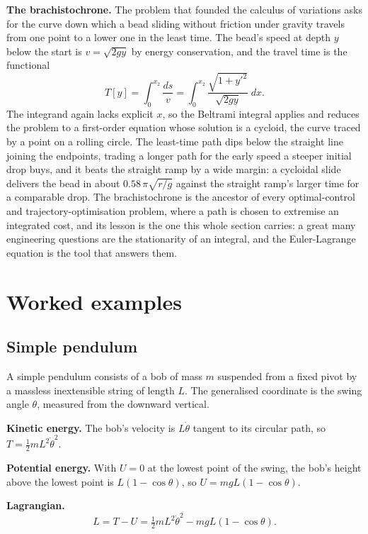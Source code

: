 \textbf{The brachistochrone.} The problem that founded the calculus of
variations asks for the curve down which a bead sliding without friction
under gravity travels from one point to a lower one in the least time. The
bead's speed at depth $y$ below the start is $v = \sqrt{2gy}$ by energy
conservation, and the travel time is the functional
\[
T[y] = \int_{0}^{x_2}\frac{ds}{v}
= \int_0^{x_2}\frac{\sqrt{1 + y'^2}}{\sqrt{2gy}}\;dx.
\]
The integrand again lacks explicit $x$, so the Beltrami integral applies and
reduces the problem to a first-order equation whose solution is a cycloid,
the curve traced by a point on a rolling circle. The least-time path dips
below the straight line joining the endpoints, trading a longer path for the
early speed a steeper initial drop buys, and it beats the straight ramp by a
wide margin: a cycloidal slide delivers the bead in about
$0.58\,\pi\sqrt{r/g}$ against the straight ramp's larger time for a
comparable drop. The brachistochrone is the ancestor of every optimal-control
and trajectory-optimisation problem, where a path is chosen to extremise an
integrated cost, and its lesson is the one this whole section carries: a great
many engineering questions are the stationarity of an integral, and the
Euler-Lagrange equation is the tool that answers them.

\section{Worked examples}

\subsection{Simple pendulum}

A simple pendulum consists of a bob of mass $m$ suspended from a
fixed pivot by a massless inextensible string of length $L$. The
generalised coordinate is the swing angle $\theta$, measured from
the downward vertical.

\textbf{Kinetic energy.} The bob's velocity is $L\dot{\theta}$
tangent to its circular path, so $T = \tfrac{1}{2} m L^2 \dot{\theta}^2$.

\textbf{Potential energy.} With $U = 0$ at the lowest point of the
swing, the bob's height above the lowest point is $L(1 - \cos\theta)$,
so $U = m g L (1 - \cos\theta)$.

\textbf{Lagrangian.}
\[
L = T - U = \tfrac{1}{2} m L^2 \dot{\theta}^2 - m g L (1 - \cos\theta).
\]

